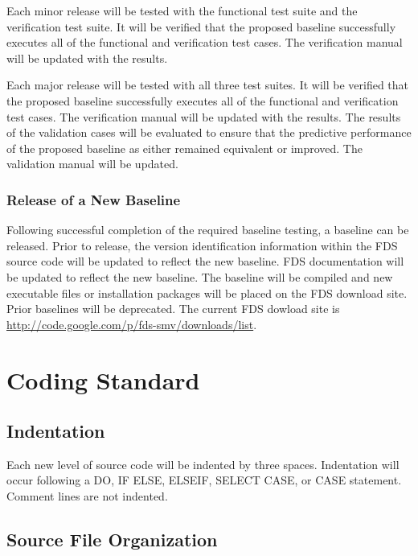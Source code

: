 \documentclass[11pt]{book}
\begin{document}
Each minor release will be tested with the functional test suite and the verification test suite.  It will be verified
that the proposed baseline successfully executes all of the functional and verification test cases.  The
verification manual will be updated with the results.

Each major release will be tested with all three test suites.    It will be verified
that the proposed baseline successfully executes all of the functional and verification test cases.  The verification
manual will be updated with the results.  The results of the validation cases will be evaluated to ensure that the
predictive performance of the proposed baseline as either remained equivalent or improved.  The validation manual will
be updated.

\subsection{Release of a New Baseline}

Following successful completion of the required baseline testing, a baseline can be released.  Prior to release, the 
version identification information within the FDS source code will be updated to reflect the new baseline.  FDS
documentation will be updated to reflect the new baseline.  The baseline will be compiled and new executable files 
or installation packages will be placed on the FDS download site.  Prior baselines will be deprecated.  The
current FDS dowload site is \href{http://code.google.com/p/fds-smv/downloads/list}
{{\ct http://code.google.com/p/fds-smv/downloads/list}}.

\chapter{Coding Standard}

\section{Indentation}

Each new level of source code will be indented by three spaces.  Indentation will occur following a {\ct DO},
{\ct IF} {\ct ELSE}, {\ct ELSEIF}, {\ct SELECT CASE}, or {\ct CASE} statement. Comment lines are not indented.

\section{Source File Organization}
\end{document}
